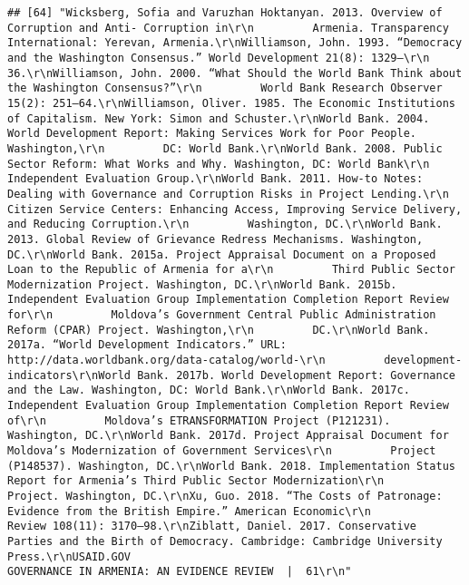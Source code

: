 \documentclass[
]{article}
\begin{document}
\begin{verbatim}
## [64] "Wicksberg, Sofia and Varuzhan Hoktanyan. 2013. Overview of Corruption and Anti- Corruption in\r\n         Armenia. Transparency International: Yerevan, Armenia.\r\nWilliamson, John. 1993. “Democracy and the Washington Consensus.” World Development 21(8): 1329–\r\n         36.\r\nWilliamson, John. 2000. “What Should the World Bank Think about the Washington Consensus?”\r\n         World Bank Research Observer 15(2): 251–64.\r\nWilliamson, Oliver. 1985. The Economic Institutions of Capitalism. New York: Simon and Schuster.\r\nWorld Bank. 2004. World Development Report: Making Services Work for Poor People. Washington,\r\n         DC: World Bank.\r\nWorld Bank. 2008. Public Sector Reform: What Works and Why. Washington, DC: World Bank\r\n      Independent Evaluation Group.\r\nWorld Bank. 2011. How-to Notes: Dealing with Governance and Corruption Risks in Project Lending.\r\n         Citizen Service Centers: Enhancing Access, Improving Service Delivery, and Reducing Corruption.\r\n         Washington, DC.\r\nWorld Bank. 2013. Global Review of Grievance Redress Mechanisms. Washington, DC.\r\nWorld Bank. 2015a. Project Appraisal Document on a Proposed Loan to the Republic of Armenia for a\r\n         Third Public Sector Modernization Project. Washington, DC.\r\nWorld Bank. 2015b. Independent Evaluation Group Implementation Completion Report Review for\r\n         Moldova’s Government Central Public Administration Reform (CPAR) Project. Washington,\r\n         DC.\r\nWorld Bank. 2017a. “World Development Indicators.” URL: http://data.worldbank.org/data-catalog/world-\r\n         development-indicators\r\nWorld Bank. 2017b. World Development Report: Governance and the Law. Washington, DC: World Bank.\r\nWorld Bank. 2017c. Independent Evaluation Group Implementation Completion Report Review of\r\n         Moldova’s ETRANSFORMATION Project (P121231). Washington, DC.\r\nWorld Bank. 2017d. Project Appraisal Document for Moldova’s Modernization of Government Services\r\n         Project (P148537). Washington, DC.\r\nWorld Bank. 2018. Implementation Status Report for Armenia’s Third Public Sector Modernization\r\n         Project. Washington, DC.\r\nXu, Guo. 2018. “The Costs of Patronage: Evidence from the British Empire.” American Economic\r\n         Review 108(11): 3170–98.\r\nZiblatt, Daniel. 2017. Conservative Parties and the Birth of Democracy. Cambridge: Cambridge University Press.\r\nUSAID.GOV                                                      GOVERNANCE IN ARMENIA: AN EVIDENCE REVIEW  |  61\r\n"                                                                                                                                                                                                                                                                                                                                                                                                                                                                                                                                                                                                                                                                                                                                                                                                     
\end{verbatim}
\end{document}
